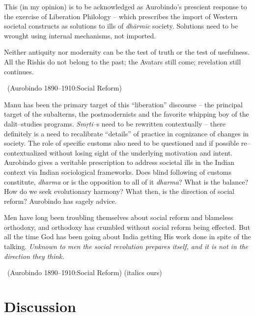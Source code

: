 This (in my opinion) is to be acknowledged as Aurobindo's prescient response to the exercise of Liberation Philology – which prescribes the import of Western societal constructs as solutions to ills of \textit{dhārmic} society. Solutions need to be wrought using internal mechanisms, not imported.

\begin{myquote}
Neither antiquity nor modernity can be the test of truth or the test of usefulness. All the Rishis do not belong to the past; the Avatars still come; revelation still continues. 

~\hfill (Aurobindo 1890–1910:Social Reform)
\end{myquote}

Manu has been the primary target of this “liberation” discourse – the principal target of the subalterns, the postmodernists and the favorite whipping boy of the dalit–studies programs. \textit{Smṛti–}s need to be rewritten contextually – there definitely is a need to recalibrate “details” of practice in cognizance of changes in society. The role of specific customs also need to be questioned and if possible re–contextualized without losing sight of the underlying motivation and intent. Aurobindo gives a veritable prescription to address societal ills in the Indian context via Indian sociological frameworks. Does blind following of customs constitute, \textit{dharma} or is the opposition to all of it \textit{dharma}? What is the balance? How do we seek evolutionary harmony? What then, is the direction of social reform? Aurobindo has sagely advice.

\begin{myquote}
Men have long been troubling themselves about social reform and blameless orthodoxy, and orthodoxy has crumbled without social reform being effected. But all the time God has been going about India getting His work done in spite of the talking. \textit{Unknown to men the social revolution prepares itself, and it is not in the direction they think.} 

~\hfill (Aurobindo 1890–1910:Social Reform) (italics ours)
\end{myquote}


\section*{Discussion}

